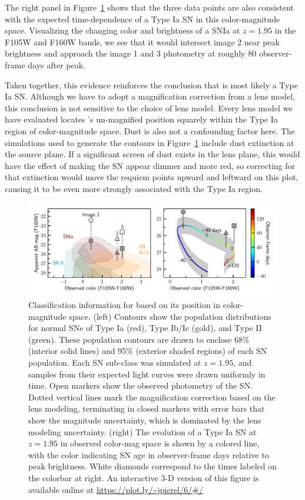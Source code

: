 \documentclass[twocolumn]{aastex63}
\begin{document}
The right panel in Figure~\ref{fig:colormag} shows that the three data points are also consistent with the expected time-dependence  of a Type Ia SN in this color-magnitude space. Visualizing the changing color and brightness of a SNIa at $z=1.95$ in the F105W and F160W bands, we see that it  would intersect image 2 near peak brightness and approach the image 1 and 3 photometry at roughly 80 observer-frame days after peak.  

Taken together, this evidence reinforces the conclusion that \SNABC is most likely a Type Ia SN.  Although we have to adopt a magnification correction 
from a lens model, this conclusion is not sensitive to the choice of lens model.  Every lens model we have evaluated locates \SNABC's un-magnified position squarely within the Type Ia region of color-magnitude space.  
Dust is also not a confounding factor here.  The simulations used to generate the contours in Figure~\ref{fig:colormag} include dust extinction at the source plane.  If a significant screen of dust exists in the lens plane, this would have the effect of making the SN appear dimmer and more red, so correcting for that extinction would move the \SNABC requiem points upward and leftward on this plot, causing it to be even more strongly associated with the Type Ia region. 


\begin{figure}
    \centering
    \includegraphics[width=\textwidth]{Paper/Figures/classification_contours_timeline.pdf}
    \caption{Classification information for \SNABC based on its position in color-magnitude space. (left) Contours show the population distributions for normal SNe of Type Ia (red), Type Ib/Ic (gold), and Type II (green).  These population contours are drawn to enclose 68\% (interior solid lines) and 95\% (exterior shaded regions) of each SN population.  Each SN sub-class was simulated at $z=1.95$, and samples from their expected light curves were drawn uniformly in time. Open markers show the observed photometry of the SN. Dotted vertical lines mark the magnification correction based on the lens modeling, terminating in closed markers with error bars that show the magnitude uncertainty, which is dominated by the lens modeling uncertainty.  (right) The evolution of a Type Ia SN at $z=1.95$ in observed color-mag space is shown by a colored line, with the color indicating SN age in observer-frame days relative to peak brightness.  White diamonds correspond to the times labeled on the colorbar at right. An interactive 3-D version of this figure is available online at \url{https://plot.ly/~jpierel/6/#/}
    }
    \label{fig:colormag}
\end{figure}
\end{document}
